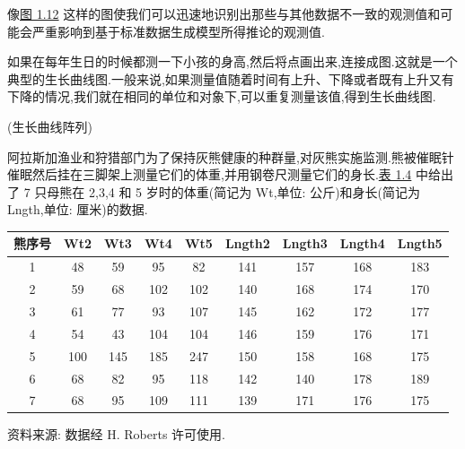 
\begin{mvfigure}
\label{fig:1.12}
\end{mvfigure}

像\hyperref[fig:1.12]{图 1.12} 这样的图使我们可以迅速地识别出那些与其他数据不一致的观测值和可能会严重影响到基于标准数据生成模型所得推论的观测值.


如果在每年生日的时候都测一下小孩的身高,然后将点画出来,连接成图.这就是一个典型的生长曲线图.一般来说,如果测量值随着时间有上升、下降或者既有上升又有下降的情况,我们就在相同的单位和对象下,可以重复测量该值,得到生长曲线图.

 (生长曲线阵列)

阿拉斯加渔业和狩猎部门为了保持灰熊健康的种群量,对灰熊实施监测.熊被催眠针催眠然后挂在三脚架上测量它们的体重,并用钢卷尺测量它们的身长.\hyperref[tab:1.4]{表 1.4} 中给出了 7 只母熊在 2,3,4 和 5 岁时的体重(简记为 Wt,单位: 公斤)和身长(简记为 Lngth,单位: 厘米)的数据.

\begin{mvtable}
\begin{tabular}{ccccccccc}
\toprule
熊序号 & Wt2 & Wt3 & Wt4 & Wt5 & Lngth2 & Lngth3 & Lngth4 & Lngth5 \\
\midrule
1 & 48 & 59 & 95 & 82 & 141 & 157 & 168 & 183 \\
2 & 59 & 68 & 102 & 102 & 140 & 168 & 174 & 170 \\
3 & 61 & 77 & 93 & 107 & 145 & 162 & 172 & 177 \\
4 & 54 & 43 & 104 & 104 & 146 & 159 & 176 & 171 \\
5 & 100 & 145 & 185 & 247 & 150 & 158 & 168 & 175 \\
6 & 68 & 82 & 95 & 118 & 142 & 140 & 178 & 189 \\
7 & 68 & 95 & 109 & 111 & 139 & 171 & 176 & 175 \\
\bottomrule
\end{tabular}
\label{tab:1.4}
\end{mvtable}

{ 资料来源: 数据经 H. Roberts 许可使用.}
